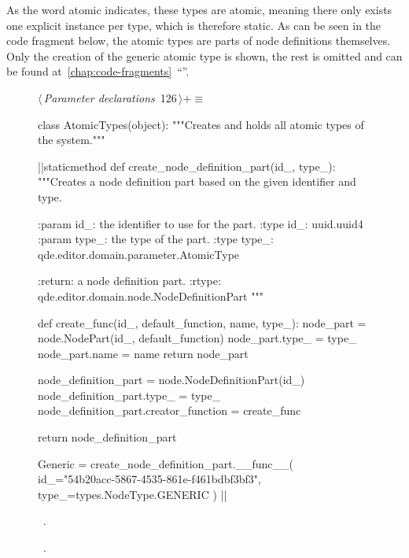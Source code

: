 \documentclass[%
    a4paper,    %
    justified,  %
    nobib,      %
    openany     %
]{tufte-book}
\makeatletter
\renewcommand{\label}[1]{\@tufte@label{##1}}%
\makeatother
\begin{document}
As the word atomic indicates, these types are atomic, meaning there only exists
one explicit instance per type, which is therefore static. As can be seen in the
code fragment below, the atomic types are parts of node definitions themselves.
Only the creation of the generic atomic type is shown, the rest is omitted and
can be found
at~\autoref{chap:code-fragments}~\enquote{}.

\begin{figure}[!htbp]
\begin{flushleft} \small
\begin{minipage}{\linewidth}\label{scrap64}\raggedright\small
{} $\langle\,${\itshape Parameter declarations}\nobreak\ {\footnotesize {126}}$\,\rangle+\equiv$
\vspace{-1ex}
\begin{pythoncode}
class AtomicTypes(object):
    """Creates and holds all atomic types of the system."""

    |\normalfont{}\fontfamily{}|staticmethod
    def create_node_definition_part(id_, type_):
        """Creates a node definition part based on the given
        identifier and type.

        :param id_: the identifier to use for the part.
        :type  id_: uuid.uuid4
        :param type_: the type of the part.
        :type type_: qde.editor.domain.parameter.AtomicType

        :return: a node definition part.
        :rtype: qde.editor.domain.node.NodeDefinitionPart
        """

        def create_func(id_, default_function, name, type_):
            node_part = node.NodePart(id_, default_function)
            node_part.type_ = type_
            node_part.name = name
            return node_part

        node_definition_part = node.NodeDefinitionPart(id_)
        node_definition_part.type_ = type_
        node_definition_part.creator_function = create_func

        return node_definition_part

    Generic = create_node_definition_part.__func__(
        id_="54b20acc-5867-4535-861e-f461bdbf3bf3",
        type_=types.NodeType.GENERIC
    )
|\NWsep|
\end{pythoncode}
\vspace{1.5ex}
\footnotesize
\begin{list}{}{\setlength{\itemsep}{-\parsep}\setlength{\itemindent}{-\leftmargin}}
\item \NWtxtMacroDefBy\ .
\item \NWtxtMacroRefIn\ .


\end{list}
\end{minipage}
\end{flushleft}
\end{figure}
\end{document}
